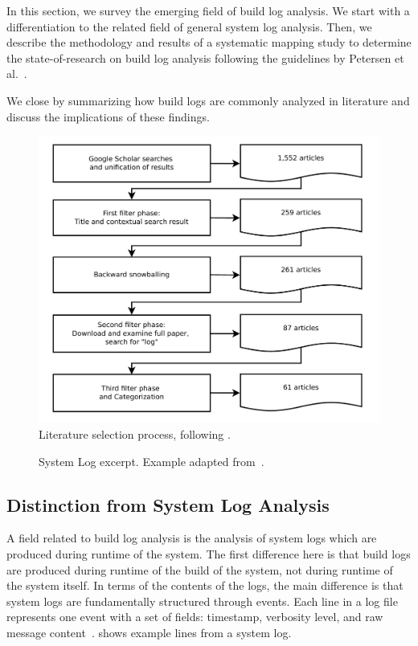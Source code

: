 In this section, we survey the emerging field of build log
analysis.
We start with a differentiation to the related field of general
system log analysis.
Then, we describe the methodology and results of a systematic mapping
study to
determine the state-of-research on build log analysis following the
guidelines by Petersen et
al.~\cite{petersen2008systematic,petersen2015guidelines}.

We close by summarizing how build logs are commonly
analyzed in literature and discuss the implications of these findings.

\begin{figure}[tb]
	\centering
	\includegraphics[width=\columnwidth, clip]{img/lit_survey.pdf}
	\caption{Literature selection process, following
	\cite{petersen2015guidelines}.}
	\label{fig:lit-survey}
\end{figure}


\begin{figure}[b]
  \centering
  
  \caption{System Log excerpt.
Example adapted from~\cite{he2017towards}.}
  \label{lst:system-log}
\end{figure}

\subsection{Distinction from System Log Analysis}
\label{sec:system-log-analysis}
A field related to build log analysis is the analysis of system
logs which are produced during runtime of the system.
The first difference here is that build logs are produced during runtime
of the build of the system, not during runtime of the system itself.
In terms of the contents of the logs, the main difference is that system
logs are fundamentally structured
through events.
Each line in a log file represents one event with a
set of fields: timestamp, verbosity level, and raw message
content~\cite{he2017towards}.
 shows
example lines from a system log.

